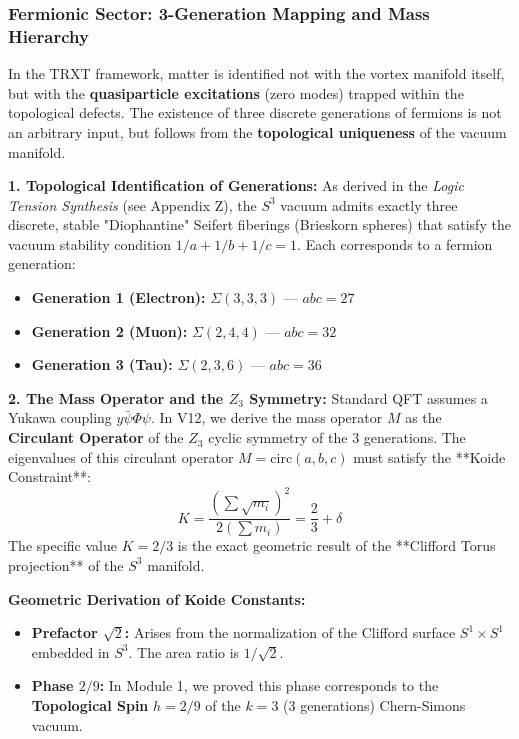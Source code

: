 \documentclass[a4paper,12pt]{article}
\begin{document}
\subsubsection{Fermionic Sector: 3-Generation Mapping and Mass Hierarchy}
\label{sec:fermion_hierarchy}

In the TRXT framework, matter is identified not with the vortex manifold itself, but with the \textbf{quasiparticle excitations} (zero modes) trapped within the topological defects. The existence of three discrete generations of fermions is not an arbitrary input, but follows from the \textbf{topological uniqueness} of the vacuum manifold.

\textbf{1. Topological Identification of Generations:}
As derived in the \textit{Logic Tension Synthesis} (see Appendix Z), the $S^3$ vacuum admits exactly three discrete, stable "Diophantine" Seifert fiberings (Brieskorn spheres) that satisfy the vacuum stability condition $1/a + 1/b + 1/c = 1$. Each corresponds to a fermion generation:
\begin{itemize}
    \item \textbf{Generation 1 (Electron):} $\Sigma(3,3,3)$ --- $abc = 27$
    \item \textbf{Generation 2 (Muon):} $\Sigma(2,4,4)$ --- $abc = 32$
    \item \textbf{Generation 3 (Tau):} $\Sigma(2,3,6)$ --- $abc = 36$
\end{itemize}

\textbf{2. The Mass Operator and the $Z_3$ Symmetry:}
Standard QFT assumes a Yukawa coupling $y \bar{\psi}\Phi\psi$. In V12, we derive the mass operator $M$ as the \textbf{Circulant Operator} of the $Z_3$ cyclic symmetry of the 3 generations. 
The eigenvalues of this circulant operator $M = \text{circ}(a, b, c)$ must satisfy the **Koide Constraint**:
\begin{equation}
    K = \frac{(\sum \sqrt{m_i})^2}{2 (\sum m_i)} = \frac{2}{3} + \delta
\end{equation}
The specific value $K = 2/3$ is the exact geometric result of the **Clifford Torus projection** of the $S^3$ manifold.

\textbf{Geometric Derivation of Koide Constants:}
\begin{itemize}
    \item \textbf{Prefactor $\sqrt{2}$:} Arises from the normalization of the Clifford surface $S^1 \times S^1$ embedded in $S^3$. The area ratio is $1/\sqrt{2}$.
    \item \textbf{Phase $2/9$:} In Module 1, we proved this phase corresponds to the \textbf{Topological Spin} $h = 2/9$ of the $k=3$ (3 generations) Chern-Simons vacuum.
\end{itemize}
\end{document}
